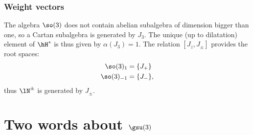 \subsubsection{Weight vectors}	\label{subSubSecweightsotrois}

The algebra $\so(3)$ does not contain abelian subalgebra of dimension bigger than one, so a Cartan subalgebra is generated by $J_3$. The unique (up to dilatation) element of $\hH^*$ is thus given by $\alpha(J_3)=1$. The relation $[J_z,J_{\pm}]$ provides the root spaces:
\begin{equation}
	\begin{aligned}
		\so(3)_1	&=\{ J_+ \}\\
		\so(3)_{-1}	&=\{ J_- \},
	\end{aligned}
\end{equation}
thus $\lN^{\pm}$ is generated by $J_{\pm}$.

\section{Two words about \texorpdfstring{$\gsu(3)$}{su3}}

